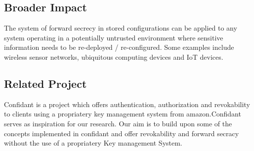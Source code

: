 \documentclass[10pt,conference]{IEEEtran}
\begin{document}
\subsection{Broader Impact}

The system of forward secrecy in stored configurations can be applied to any system operating in a 
potentially untrusted environment where sensitive information needs to be re-deployed / 
re-configured. Some examples include wireless sensor networks, ubiquitous computing devices and IoT 
devices.


\subsection{Related Project}
Confidant\cite{lyft_confidant:_2016} is a project which offers authentication, authorization 
and revokability to clients using a propriatery key management system from amazon.Confidant serves 
as inspiration for our research. Our aim is to build upon some of the concepts implemented in 
confidant and offer revokability and forward secracy without the use of a propriatery Key management 
System.







\end{document}
